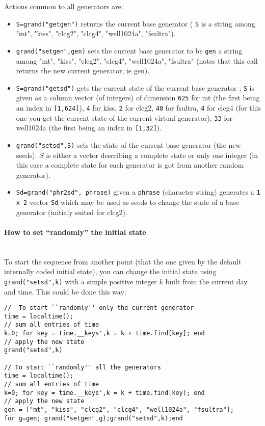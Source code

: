 Actions common to all generators are:
\begin{itemize}

\item {}  \verb!S=grand("getgen")! returns the current base generator ( \verb!S! is
  a string among "mt", "kiss", "clcg2", "clcg4", "well1024a", "fsultra").
\item {} \verb!grand("setgen",gen)! sets the current base generator to be \verb!gen!
  a string among "mt", "kiss", "clcg2", "clcg4", "well1024a", "fsultra" (notes that this call 
  returns the new current generator, ie gen).
\item {} \verb!S=grand("getsd")! gets the current state of the current base
  generator ; \verb!S! is given as a column vector (of integers) of dimension \verb!625! 
  for mt (the first being an index in \verb![1,624]!), \verb!4! for kiss, \verb!2! 
  for clcg2,  \verb!40! for fsultra, \verb!4! for clcg4 (for this one
  you get the current state of the current virtual generator), \verb!33! for
  well1024a (the first being an index in \verb![1,32]!).
\item {} \verb!grand("setsd",S)! sets the state of the current 
  base generator (the new seeds). $S$ is either a vector describing a
  complete state or only one integer (in this case a complete state for each
  generator is got from another random generator). 
\item {} \verb!Sd=grand("phr2sd", phrase)! given a \verb!phrase! (character string) generates 
  a \verb!1 x 2! vector \verb!Sd! which may be used as seeds to change the state of a 
  base generator (initialy suited for clcg2). 
\end{itemize}

\paragraph{How to set ``randomly'' the initial state}
~~\\

  To start the sequence from another point (that the one given by
 the default internally coded initial state), you can change the initial state using 
  \verb+grand("setsd",k)+ with a simple positive integer $k$ built from 
  the current day and time. This could be done this way:
\begin{Verbatim}
//  To start ``randomly'' only the current generator
time = localtime(); 
// sum all entries of time
k=0; for key = time.__keys',k = k + time.find[key]; end 
// apply the new state
grand("setsd",k)

// To start ``randomly'' all the generators
time = localtime(); 
// sum all entries of time
k=0; for key = time.__keys',k = k + time.find[key]; end 
// apply the new state
gen = ["mt", "kiss", "clcg2", "clcg4", "well1024a", "fsultra"];
for g=gen; grand("setgen",g);grand("setsd",k);end
\end{Verbatim}




